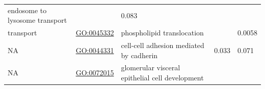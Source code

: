 \documentclass[
]{article}
\begin{document}
\begin{longtable}[]{@{}lllll@{}}
\begin{minipage}[t]{0.17\columnwidth}
endosome to lysosome transport\strut
\end{minipage} & \begin{minipage}[t]{0.17\columnwidth}\raggedright
\strut
\end{minipage} & \begin{minipage}[t]{0.17\columnwidth}\raggedright
0.083\strut
\end{minipage}\tabularnewline
\begin{minipage}[t]{0.17\columnwidth}\raggedright
transport\strut
\end{minipage} & \begin{minipage}[t]{0.17\columnwidth}\raggedright
\url{GO:0045332}\strut
\end{minipage} & \begin{minipage}[t]{0.17\columnwidth}\raggedright
phospholipid translocation\strut
\end{minipage} & \begin{minipage}[t]{0.17\columnwidth}\raggedright
\strut
\end{minipage} & \begin{minipage}[t]{0.17\columnwidth}\raggedright
0.0058\strut
\end{minipage}\tabularnewline
\begin{minipage}[t]{0.17\columnwidth}\raggedright
NA\strut
\end{minipage} & \begin{minipage}[t]{0.17\columnwidth}\raggedright
\url{GO:0044331}\strut
\end{minipage} & \begin{minipage}[t]{0.17\columnwidth}\raggedright
cell-cell adhesion mediated by cadherin\strut
\end{minipage} & \begin{minipage}[t]{0.17\columnwidth}\raggedright
0.033\strut
\end{minipage} & \begin{minipage}[t]{0.17\columnwidth}\raggedright
0.071\strut
\end{minipage}\tabularnewline
\begin{minipage}[t]{0.17\columnwidth}\raggedright
NA\strut
\end{minipage} & \begin{minipage}[t]{0.17\columnwidth}\raggedright
\url{GO:0072015}\strut
\end{minipage} & \begin{minipage}[t]{0.17\columnwidth}\raggedright
glomerular visceral epithelial cell development\strut
\end{minipage} & \begin{minipage}[t]{0.17\columnwidth}\raggedright

\end{minipage}
\end{longtable}
\end{document}

